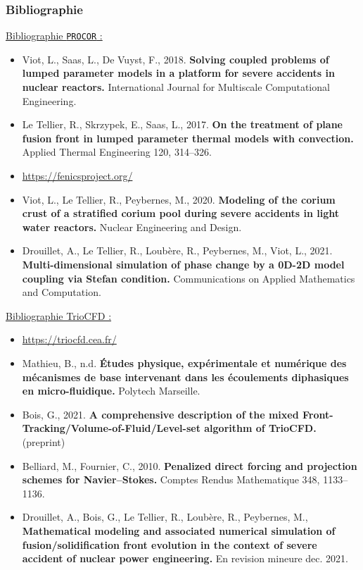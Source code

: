 \documentclass{beamer}
\newcommand{\procor}{\texttt{PROCOR}}
\begin{document}
\begin{frame}
    \frametitle{Bibliographie}
	\scriptsize
\color{cea_rouge}\underline{Bibliographie \procor{} :} \color{cea_texte}
\begin{itemize}
	\item Viot, L., Saas, L., De Vuyst, F., 2018. \textbf{Solving coupled problems of lumped parameter models in a platform for severe accidents in nuclear reactors.} International Journal for Multiscale Computational Engineering.
	\item Le Tellier, R., Skrzypek, E., Saas, L., 2017. \textbf{On the treatment of plane fusion front in lumped parameter thermal models with convection.} Applied Thermal Engineering 120, 314–326. 
	\item \url{https://fenicsproject.org/} 
	\item Viot, L., Le Tellier, R., Peybernes, M., 2020. \textbf{Modeling of the corium crust of a stratified corium pool during severe accidents in light water reactors.} Nuclear Engineering and Design.
	\item \color{blue} Drouillet, A., Le Tellier, R., Loubère, R., Peybernes, M., Viot, L., 2021. \textbf{Multi-dimensional simulation of phase change by a 0D-2D model coupling via Stefan condition.} Communications on Applied Mathematics and Computation.

\end{itemize}
\color{cea_rouge}\underline{Bibliographie TrioCFD :} \color{cea_texte}


\begin{itemize}
	\item \url{https://triocfd.cea.fr/}
	\item Mathieu, B., n.d. \textbf{Études physique, expérimentale et numérique des mécanismes de base intervenant dans les écoulements diphasiques en micro-fluidique.} Polytech Marseille.
	\item Bois, G., 2021. \textbf{A comprehensive description of the mixed Front-Tracking/Volume-of-Fluid/Level-set algorithm of TrioCFD.} (preprint)
	\item Belliard, M., Fournier, C., 2010. \textbf{Penalized direct forcing and projection schemes for Navier–Stokes.} Comptes Rendus Mathematique 348, 1133–1136.
	\item \color{blue} Drouillet, A., Bois, G., Le Tellier, R., Loubère, R., Peybernes, M.,  \textbf{Mathematical modeling and associated numerical simulation of fusion/solidification front evolution in the context of severe accident of nuclear power engineering.} En revision mineure dec. 2021.
 

\end{itemize}
\end{frame}
\end{document}
